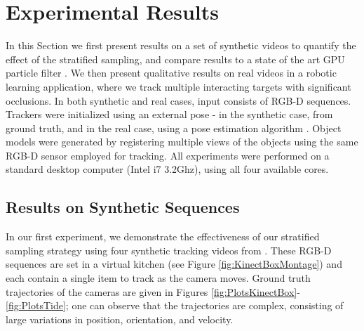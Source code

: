 \section{Experimental Results}
\label{sec:ExperimentalResults}
In this Section we first present results on a set of synthetic videos to quantify the effect of the stratified sampling, and compare results to a state of the art GPU particle filter \cite{Choi_IROS2013}. We then present qualitative results on real videos in a robotic learning application, where we track multiple interacting targets with significant occlusions. In both synthetic and real cases, input consists of RGB-D sequences. Trackers were initialized using an external pose - in the synthetic case, from ground truth, and in the real case, using a pose estimation algorithm \cite{Buch_CVPR2014}. Object models were generated by registering multiple views of the objects using the same RGB-D sensor employed for tracking. All experiments were performed on a standard desktop computer (Intel i7 3.2Ghz), using all four available cores.

\subsection{Results on Synthetic Sequences}
In our first experiment, we demonstrate the effectiveness of our stratified sampling strategy using four synthetic tracking videos from \cite{Choi_IROS2013}. These RGB-D sequences are set in a virtual kitchen (see Figure \ref{fig:KinectBoxMontage}) and each contain a single item to track as the camera moves. Ground truth trajectories of the cameras are given in Figures \ref{fig:PlotsKinectBox}-\ref{fig:PlotsTide}; one can observe that the trajectories are complex, consisting of large variations in position, orientation, and velocity.  

